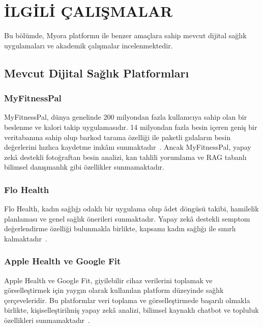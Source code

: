 \section{İLGİLİ ÇALIŞMALAR}
\label{sec:ilgili}

Bu bölümde, Myora platformu ile benzer amaçlara sahip mevcut dijital sağlık uygulamaları ve akademik çalışmalar incelenmektedir.

\subsection{Mevcut Dijital Sağlık Platformları}

\subsubsection{MyFitnessPal}
MyFitnessPal, dünya genelinde 200 milyondan fazla kullanıcıya sahip olan bir beslenme ve kalori takip uygulamasıdır. 14 milyondan fazla besin içeren geniş bir veritabanına sahip olup barkod tarama özelliği ile paketli gıdaların besin değerlerini hızlıca kaydetme imkânı sunmaktadır~\cite{MyFitnessPal2024}. Ancak MyFitnessPal, yapay zekâ destekli fotoğraftan besin analizi, kan tahlili yorumlama ve RAG tabanlı bilimsel danışmanlık gibi özellikler sunmamaktadır.

\subsubsection{Flo Health}
Flo Health, kadın sağlığı odaklı bir uygulama olup âdet döngüsü takibi, hamilelik planlaması ve genel sağlık önerileri sunmaktadır. Yapay zekâ destekli semptom değerlendirme özelliği bulunmakla birlikte, kapsamı kadın sağlığı ile sınırlı kalmaktadır~\cite{Flo2024}.

\subsubsection{Apple Health ve Google Fit}
Apple Health ve Google Fit, giyilebilir cihaz verilerini toplamak ve görselleştirmek için yaygın olarak kullanılan platform düzeyinde sağlık çerçeveleridir. Bu platformlar veri toplama ve görselleştirmede başarılı olmakla birlikte, kişiselleştirilmiş yapay zekâ analizi, bilimsel kaynaklı chatbot ve topluluk özellikleri sunmamaktadır~\cite{AppleHealth2024}.

